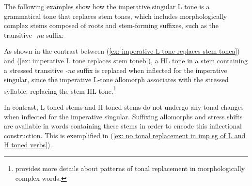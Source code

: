 
The following examples show how the imperative singular L tone is a grammatical tone that replaces stem tones, which includes morphologically complex stems composed of roots and stem-forming suffixes, such as the transitive \textit{-na} suffix:

\ea\label{ex: imperative L tone replaces stem tone}

    \label{ex: imperative L tone replaces stem tonea}
        \label{ex: imperative L tone replaces stem toneb}
    \z
\z

As shown in the contrast between (\ref{ex: imperative L tone replaces stem tonea}) and (\ref{ex: imperative L tone replaces stem toneb}), a HL tone in a stem containing a stressed transitive \textit{-na} suffix is replaced when inflected for the imperative singular, since the imperative L-tone allomorph associates with the stressed syllable, replacing the stem HL tone.\footnote{ provides more details about patterns of tonal replacement in morphologically complex words.}

\hspace*{-3.5pt}In contrast, L-toned stems and H-toned stems do not undergo any tonal changes when inflected for the imperative singular. Suffixing allomorphs and stress shifts are available in words containing these stems in order to encode this inflectional construction. This is exemplified in (\ref{ex: no tonal replacement in imp sg of L and H toned verbs}).

